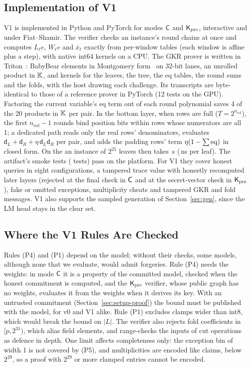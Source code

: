 \subsection{Implementation of V1}

V1 is implemented in Python and PyTorch for modes $\mathsf{C}$ and $\mathsf{K}_{\mathrm{pre}}$, interactive and under
Fiat--Shamir. The verifier checks an instance's round chains at once and
computes $L_\ell e$, $W_\ell e$ and $\bar x_\ell$ exactly from per-window tables (each window is
affine plus a step), with native int64 kernels on a CPU. The GKR
prover is written in Triton~\cite{tillet2019triton}: BabyBear elements in Montgomery
form~\cite{montgomery1985} on 32-bit lanes, an unrolled product in $\mathbb{K}$, and kernels for the
leaves, the tree, the eq tables, the round sums and the folds, with the host drawing each
challenge. Its transcripts are byte-identical to those of a reference prover in PyTorch (12 tests
on the GPU). Factoring the current variable's eq term out of each round polynomial saves 4 of the
20 products in $\mathbb{K}$ per pair. In the bottom layer, when rows are full ($T =
2^{n_{\mathrm{col}}}$), the first $n_{\mathrm{col}} - 1$ rounds bind position bits within rows whose
numerators are all 1; a dedicated path reads only the real rows' denominators, evaluates $\mathsf
d_L + \mathsf d_R + \eta\, \mathsf d_L \mathsf d_R$ per pair, and adds the padding rows' term $\eta
(1 - \sum \mathrm{eq})$ in closed form. On the \PlatformGpu{} an instance of $2^{25}$ leaves then takes
\GkrSecondsLarge{}\,s (\GkrNsPerLeaf{}\,ns per leaf). The artifact's smoke tests (\SmokeTests{}
tests) pass on the platform. For V1 they cover honest queries in eight configurations, a tampered
trace value with honestly recomputed later layers (rejected at the final check in $\mathsf{C}$ and at the
secret-vector check in $\mathsf{K}_{\mathrm{pre}}$), fake or omitted exceptions, multiplicity cheats and tampered GKR
and fold messages. V1 also supports the sampled generation of Section~\ref{sec:gen}, since the LM
head stays in the clear set.

\subsection{Where the V1 Rules Are Checked}

Rules (P4) and (P1) depend on the model; without their checks, some models, although none that we
evaluate, would admit forgeries. Rule (P4) needs the weights: in mode $\mathsf{C}$ it is a property of the
committed model, checked when the honest commitment is computed, and the $\mathsf{K}_{\mathrm{pre}}$ verifier, whose
public graph has no weights, evaluates it from the weights when it derives its key. With an
untrusted commitment (Section~\ref{sec:setup-proof}) the bound must be published with the model,
for v0 and V1 alike. Rule (P1) excludes clamps wider than int8, which would break the bound on
$|L|$. The verifier also rejects fold coefficients in $[p, 2^{31})$, which alias field elements, and
range-checks the inputs of cut operations as defence in depth. One limit affects completeness only:
the exception bin of width 1 is not covered by (P5), and multiplicities are encoded like claims, below $2^{29}$, so a proof with $2^{29}$ or more clamped entries cannot be encoded.

